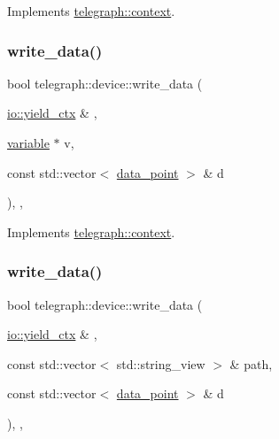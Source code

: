 Implements \hyperlink{classtelegraph_1_1context_a8db167973f187f707a4108e112683969}{telegraph\+::context}.

\mbox{\label{classtelegraph_1_1device_a60150e55bc6fb63d27252051caf462db}} 
\subsubsection{\texorpdfstring{write\+\_\+data()}{write\_data()}\hspace{0.1cm}{\footnotesize\ttfamily [1/2]}}
{\footnotesize\ttfamily bool telegraph\+::device\+::write\+\_\+data (\begin{DoxyParamCaption}\item[{\hyperlink{structboost_1_1asio_1_1yield__ctx}{io\+::yield\+\_\+ctx} \&}]{,  }\item[{\hyperlink{classtelegraph_1_1variable}{variable} $\ast$}]{v,  }\item[{const std\+::vector$<$ \hyperlink{classtelegraph_1_1data__point}{data\+\_\+point} $>$ \&}]{d }\end{DoxyParamCaption})\hspace{0.3cm}{\ttfamily [inline]}, {\ttfamily [override]}, {\ttfamily [virtual]}}



Implements \hyperlink{classtelegraph_1_1context_a6067b9a6f2590733c81f6a3b2ed9cba7}{telegraph\+::context}.

\mbox{\label{classtelegraph_1_1device_aaedca7b20bc36f8439d5afccbcaf1304}} 
\subsubsection{\texorpdfstring{write\+\_\+data()}{write\_data()}\hspace{0.1cm}{\footnotesize\ttfamily [2/2]}}
{\footnotesize\ttfamily bool telegraph\+::device\+::write\+\_\+data (\begin{DoxyParamCaption}\item[{\hyperlink{structboost_1_1asio_1_1yield__ctx}{io\+::yield\+\_\+ctx} \&}]{,  }\item[{const std\+::vector$<$ std\+::string\+\_\+view $>$ \&}]{path,  }\item[{const std\+::vector$<$ \hyperlink{classtelegraph_1_1data__point}{data\+\_\+point} $>$ \&}]{d }\end{DoxyParamCaption})\hspace{0.3cm}{\ttfamily [inline]}, {\ttfamily [override]}, {\ttfamily [virtual]}}



